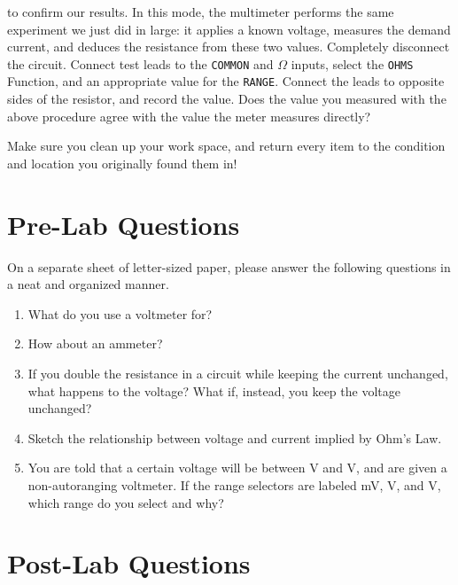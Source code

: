 \documentclass[12pt]{article}
\begin{document}
\begin{enumerate}
  to confirm our results.  In this mode, the multimeter performs the
  same experiment we just did in large: it applies a known voltage,
  measures the demand current, and deduces the resistance from these
  two values.  Completely disconnect the circuit.  Connect test leads
  to the \texttt{COMMON} and \texttt{$\Omega$} inputs, select the
  \texttt{OHMS} Function, and an appropriate value for the
  \texttt{RANGE}.  Connect the leads to opposite sides of the
  resistor, and record the value.  Does the value you measured with
  the above procedure agree with the value the meter measures
  directly?
\end{enumerate}

Make sure you clean up your work space, and return every item to the
condition and location you originally found them in!

\newpage

\section*{Pre-Lab Questions}

On a separate sheet of letter-sized paper, please answer the following
questions in a neat and organized manner.  

\begin{enumerate}
\item What do you use a voltmeter for?
\item How about an ammeter?
\item If you double the resistance in a circuit while keeping the
  current unchanged, what happens to the voltage?  What if, instead,
  you keep the voltage unchanged?
\item Sketch the relationship between voltage and current implied by
  Ohm's Law.
\item You are told that a certain voltage will be between \unit[3]{V}
  and \unit[5]{V}, and are given a non-autoranging voltmeter.  If the
  range selectors are labeled \unit[200]{mV}, \unit[2]{V}, and
  \unit[20]{V}, which range do you select and why?
\end{enumerate}

\newpage

\section*{Post-Lab Questions}
\end{document}
